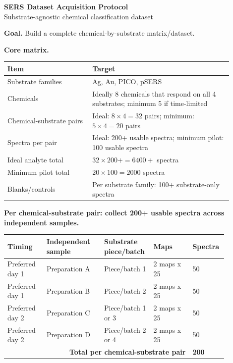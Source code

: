\documentclass[10pt]{article}
\begin{document}
\begin{center}
{\Large\bfseries SERS Dataset Acquisition Protocol}\\[-1pt]
{\normalsize Substrate-agnostic chemical classification dataset}
\end{center}

\textbf{Goal.} Build a complete chemical-by-substrate matrix/dataset. 

\textbf{Core matrix.}
\begin{center}
\begin{tabular}{p{0.34\linewidth}p{0.56\linewidth}}
\toprule
\textbf{Item} & \textbf{Target} \\
\midrule
Substrate families & Ag, Au, PICO, pSERS \\
Chemicals & Ideally 8 chemicals that respond on all 4 substrates; minimum 5 if time-limited \\
Chemical-substrate pairs & Ideal: $8 \times 4 = 32$ pairs; minimum: $5 \times 4 = 20$ pairs \\
Spectra per pair & Ideal: 200+ usable spectra; minimum pilot: 100 usable spectra \\
Ideal analyte total & $32 \times 200+ = 6400+$ spectra \\
Minimum pilot total & $20 \times 100 = 2000$ spectra \\
Blanks/controls & Per substrate family: 100+ substrate-only spectra \\
\bottomrule
\end{tabular}
\end{center}

\textbf{Per chemical-substrate pair: collect 200+ usable spectra across independent samples.}
\begin{center}
\begin{tabular}{p{0.17\linewidth}p{0.25\linewidth}p{0.17\linewidth}p{0.17\linewidth}p{0.12\linewidth}}
\toprule
\textbf{Timing} & \textbf{Independent sample} & \textbf{Substrate piece/batch} & \textbf{Maps} & \textbf{Spectra} \\
\midrule
Preferred day 1 & Preparation A & Piece/batch 1 & 2 maps x 25 & 50 \\
Preferred day 1 & Preparation B & Piece/batch 2 & 2 maps x 25 & 50 \\
Preferred day 2 & Preparation C & Piece/batch 1 or 3 & 2 maps x 25 & 50 \\
Preferred day 2 & Preparation D & Piece/batch 2 or 4 & 2 maps x 25 & 50 \\
\midrule
\multicolumn{4}{r}{\textbf{Total per chemical-substrate pair}} & \textbf{200} \\
\bottomrule
\end{tabular}
\end{center}
\end{document}

